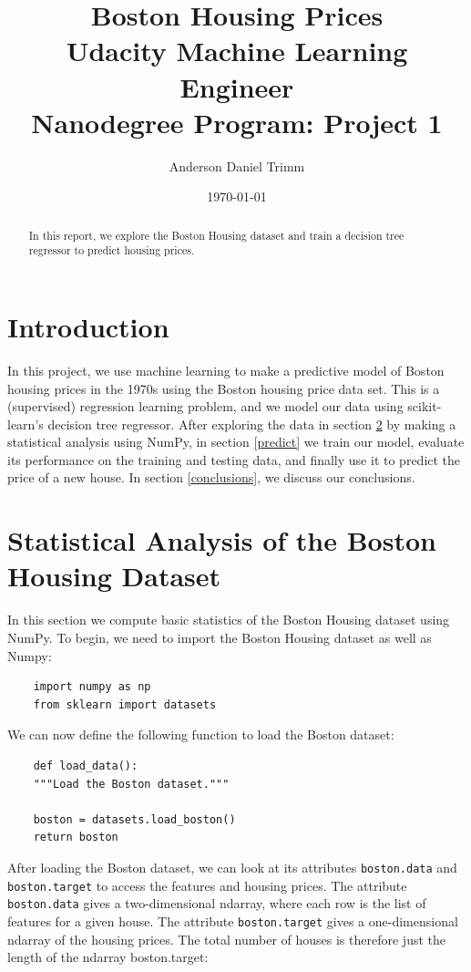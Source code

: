 \documentclass[12 pt]{article}
\numberwithin{equation}{section}
\begin{document}
\title{Boston Housing Prices \\ \footnotesize{Udacity Machine Learning Engineer \\ Nanodegree Program: Project 1}}
\author{Anderson Daniel Trimm}
\date{\today}
\maketitle
\begin{abstract}
In this report, we explore the Boston Housing dataset and train a decision tree regressor to predict housing prices.
\end{abstract}
\section{Introduction}
In this project, we use machine learning to make a predictive model of Boston housing prices in the 1970s using the Boston housing price data set. This is a (supervised) regression learning problem, and we model our data using scikit-learn's decision tree regressor. After exploring the data in section \ref{stats} by making a statistical analysis using NumPy, in section \ref{predict} we train our model, evaluate its performance on the training and testing data, and finally use it to predict the price of a new house. In section \ref{conclusions}, we discuss our conclusions.
\section{Statistical Analysis of the Boston Housing Dataset}\label{stats}
In this section we compute basic statistics of the Boston Housing dataset using NumPy. To begin, we need to import the Boston Housing dataset as well as Numpy:

\begin{verbatim}
	import numpy as np
	from sklearn import datasets
\end{verbatim}

We can now define the following function to load the Boston dataset:

\begin{verbatim}
	def load_data():
    """Load the Boston dataset."""

    boston = datasets.load_boston()
    return boston
\end{verbatim}
After loading the Boston dataset, we can look at its attributes \texttt{boston.data} and \texttt{boston.target} to access the features and housing prices. The attribute \texttt{boston.data} gives a two-dimensional ndarray, where each row is the list of features for a given house. The attribute \texttt{boston.target} gives a one-dimensional ndarray of the housing prices. The total number of houses is therefore just the length of the ndarray boston.target:
\end{document}

